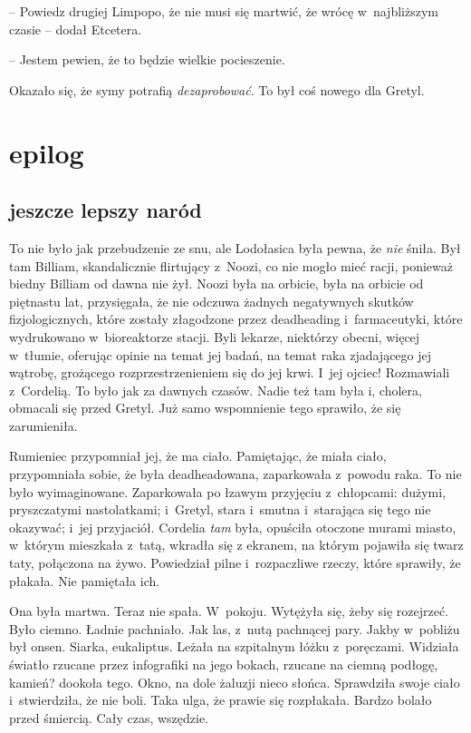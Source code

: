 \documentclass[oneside,polish,11pt,sfheadings]{mwbk}
\begin{document}
-- Powiedz drugiej Limpopo, że nie musi się martwić, że wrócę w~najbliższym czasie -- dodał Etcetera.

-- Jestem pewien, że to będzie wielkie pocieszenie.

Okazało się, że symy potrafią \textit{dezaprobować}. To był coś nowego dla
Gretyl.

\part*{epilog}
\chapter*{jeszcze lepszy naród}

To nie było jak przebudzenie ze snu, ale Lodołasica była pewna, że
\textit{nie} śniła. Był tam Billiam, skandalicznie flirtujący z~Noozi, co
nie mogło mieć racji, ponieważ biedny Billiam od dawna nie żył. Noozi
była na orbicie, była na orbicie od piętnastu lat, przysięgała, że nie
odczuwa żadnych negatywnych skutków fizjologicznych, które zostały
złagodzone przez deadheading i~farmaceutyki, które wydrukowano w~bioreaktorze stacji. Byli lekarze, niektórzy obecni, więcej w~tłumie,
oferując opinie na temat jej badań, na temat raka zjadającego jej
wątrobę, grożącego rozprzestrzenieniem się do jej krwi. I~jej ojciec!
Rozmawiali z~Cordelią. To było jak za dawnych czasów. Nadie też tam była
i, cholera, obmacali się przed Gretyl. Już samo wspomnienie tego
sprawiło, że się zarumieniła.

Rumieniec przypomniał jej, że ma ciało. Pamiętając, że miała ciało,
przypomniała sobie, że była deadheadowana, zaparkowała z~powodu raka. To
nie było wyimaginowane. Zaparkowała po łzawym przyjęciu z~chłopcami:
dużymi, pryszczatymi nastolatkami; i~Gretyl, stara i~smutna i~starająca
się tego nie okazywać; i~jej przyjaciół. Cordelia \textit{tam} była,
opuściła otoczone murami miasto, w~którym mieszkała z~tatą, wkradła się
z ekranem, na którym pojawiła się twarz taty, połączona na żywo.
Powiedział pilne i~rozpaczliwe rzeczy, które sprawiły, że płakała. Nie
pamiętała ich.

Ona była martwa. Teraz nie spała. W~pokoju. Wytężyła się, żeby się
rozejrzeć. Było ciemno. Ładnie pachniało. Jak las, z~nutą pachnącej
pary. Jakby w~pobliżu był onsen. Siarka, eukaliptus. Leżała na
szpitalnym łóżku z~poręczami. Widziała światło rzucane przez infografiki
na jego bokach, rzucane na ciemną podłogę, kamień? dookoła tego. Okno,
na dole żaluzji nieco słońca. Sprawdziła swoje ciało i~stwierdziła, że
nie boli. Taka ulga, że prawie się rozpłakała. Bardzo bolało przed
śmiercią. Cały czas, wszędzie.
\end{document}
